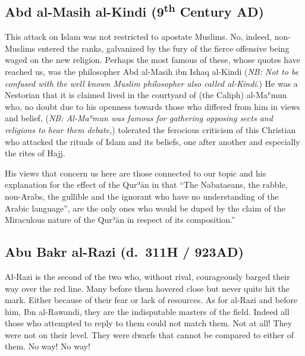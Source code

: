 \documentclass[12pt]{memoir}
\def\´{ʾ} %
\def\`{ʿ} %
\let \Sup=\textsuperscript
\def \Quran{Qur\-\´ān} %
\let \Qrn=\Quran      %
\newcommand{\NB}[1]{\emph{\small NB: #1}}
\begin{document}


\subsection{Abd al-Masih al-Kindi (9\Sup{th} Century AD)}

This attack on Islam was not restricted to apostate Muslims. No, indeed,
non-Muslims entered the ranks, galvanized by the fury of the fierce offensive
being waged on the new religion. Perhaps the most famous of these, whose quotes
have reached us, was the philosopher Abd al-Masih ibn Ishaq al-Kindi
(\NB{Not to be confused with the well known Muslim philosopher also called
al-Kindi}.)\@
He was a Nestorian that it is claimed lived in the courtyard of (the Caliph)
al-Ma\`mun who, no doubt due to his openness towards those
who differed from him in views and belief,
(\NB{Al-Ma\`mun was famous for gathering opposing sects and religions to hear
them debate,})
tolerated the ferocious criticism of this
Christian who attacked the rituals of Islam and its beliefs, one after another
and especially the rites of Hajj.

His views that concern us here are those connected to our topic and his
explanation for the effect of the \Qrn{} in that “The Nabataeans, the rabble,
non-Arabs, the gullible and the ignorant who have no understanding of the
Arabic language”, are the only ones who would be duped by the claim of the
Miraculous nature of the \Qrn{} in respect of its composition.”\footnotemark



\subsection{Abu Bakr al-Razi (d.\ 311H / 923AD)}

Al-Razi is the second of the two who, without rival,
courageously barged their way over the red line.
Many before them hovered close but never quite hit the mark.
Either because of their fear or lack of resources.
As for al-Razi and before him, Ibn al-Rawandi, they are the indisputable
masters of the field.
Indeed all those who attempted to reply to them could not match them.
Not at all! They were not on their level.
They were dwarfs that cannot be compared to either of them.
No way! No way!
\end{document}
